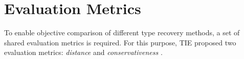 
\section{Evaluation Metrics}



To enable objective comparison of different type recovery methods, a set of shared evaluation metrics is required. For this purpose, TIE proposed two evaluation metrics: \textit{distance} and \textit{conservativeness} \cite{tie_reverse_engineering_of_types}.





